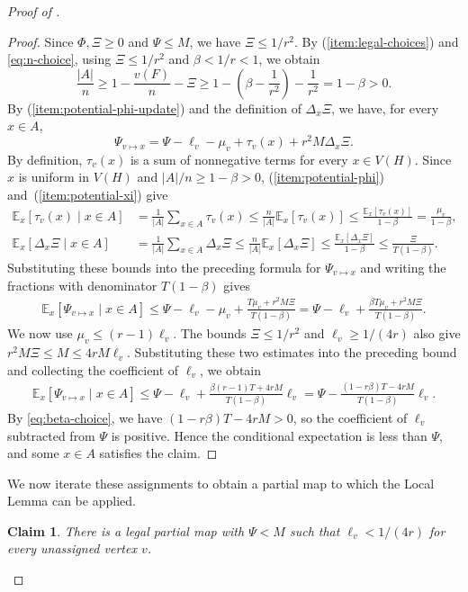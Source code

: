 \documentclass[10pt]{article}
\numberwithin{equation}{section}
\newtheorem{claim}[claim]{Claim}
\newcommand{\E}{\mathbb E}
\begin{document}
\begin{proof}[Proof of ]
\begin{proof}
Since $\Phi,\Xi\ge0$ and $\Psi\le M$, we have $\Xi\le1/r^2$. By (\ref{item:legal-choices}) and \eqref{eq:n-choice}, using $\Xi\le1/r^2$ and $\beta<1/r<1$, we obtain
\[
\frac{|A|}{n}
\ge1-\frac{v(F)}n-\Xi
\ge1-\left(\beta-\frac1{r^2}\right)-\frac1{r^2}
=1-\beta>0.
\]
By (\ref{item:potential-phi-update}) and the definition of $\Delta_x\Xi$, we have, for every $x\in A$,
\[
\Psi_{v\mapsto x}=\Psi-\ell_v-\mu_v+\tau_v(x)+r^2M\Delta_x\Xi.
\]
By definition, $\tau_v(x)$ is a sum of nonnegative terms for every $x\in V(H)$. Since $x$ is uniform in $V(H)$ and $|A|/n\ge1-\beta>0$, (\ref{item:potential-phi}) and~(\ref{item:potential-xi}) give
\[
\begin{aligned}
\E_x[\tau_v(x)\mid x\in A]
&=\frac1{|A|}\sum_{x\in A}\tau_v(x)
\le\frac{n}{|A|}\E_x[\tau_v(x)]
\le\frac{\E_x[\tau_v(x)]}{1-\beta}
=\frac{\mu_v}{1-\beta},\\
\E_x[\Delta_x\Xi\mid x\in A]
&=\frac1{|A|}\sum_{x\in A}\Delta_x\Xi
\le\frac{n}{|A|}\E_x[\Delta_x\Xi]
\le\frac{\E_x[\Delta_x\Xi]}{1-\beta}
\le\frac{\Xi}{T(1-\beta)}.
\end{aligned}
\]
Substituting these bounds into the preceding formula for $\Psi_{v\mapsto x}$ and writing the fractions with denominator $T(1-\beta)$ gives
\begin{align*}
\E_x[\Psi_{v\mapsto x}\mid x\in A]
\le\Psi-\ell_v-\mu_v
+\frac{T\mu_v+r^2M\Xi}{T(1-\beta)}
=\Psi-\ell_v+\frac{\beta T\mu_v+r^2M\Xi}{T(1-\beta)}.
\end{align*}
We now use $\mu_v\le(r-1)\ell_v$. The bounds $\Xi\le1/r^2$ and $\ell_v\ge1/(4r)$ also give $r^2M\Xi\le M\le4rM\ell_v$. Substituting these two estimates into the preceding bound and collecting the coefficient of $\ell_v$, we obtain
\begin{align*}
\E_x[\Psi_{v\mapsto x}\mid x\in A]
\le\Psi-\ell_v
+\frac{\beta(r-1)T+4rM}{T(1-\beta)}\ell_v
=\Psi-\frac{(1-r\beta)T-4rM}{T(1-\beta)}\ell_v.
\end{align*}
By \eqref{eq:beta-choice}, we have $(1-r\beta)T-4rM>0$, so the coefficient of $\ell_v$ subtracted from $\Psi$ is positive. Hence the conditional expectation is less than $\Psi$, and some $x\in A$ satisfies the claim.
\end{proof}

We now iterate these assignments to obtain a partial map to which the Local Lemma can be applied.

\begin{claim}\label{clm:small-load-map}
There is a legal partial map with $\Psi<M$ such that $\ell_v<1/(4r)$ for every unassigned vertex $v$.
\end{claim}


\end{proof}
\end{document}
